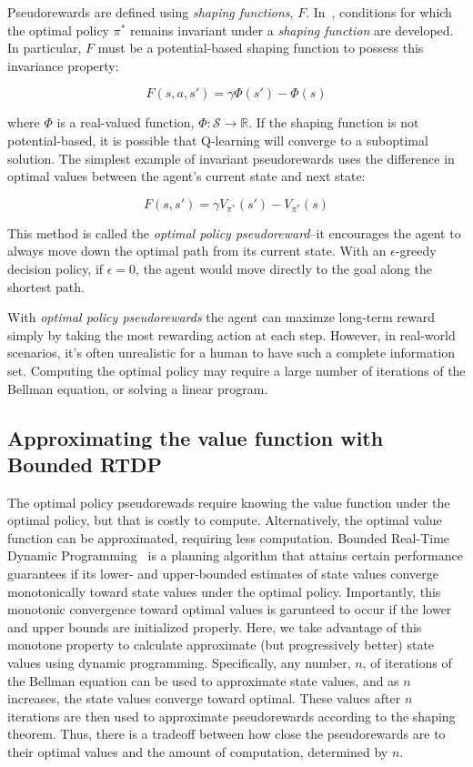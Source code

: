 \documentclass[letterpaper]{article}
\begin{document}
Pseudorewards are defined using \textit{shaping functions}, $F$.  In~\cite{ng1999policy}, conditions for which the optimal policy $\pi^*$ remains invariant under a \textit{shaping function} are developed. In particular, $F$ must be a potential-based shaping function to possess this invariance property:

\begin{equation}
F(s, a,s') = \gamma \Phi(s') - \Phi(s) 
\end{equation}

\noindent
where $\Phi$ is a real-valued function, $\Phi : \mathcal{S} \rightarrow \mathbb{R}$. If the shaping function is not potential-based, it is possible that Q-learning will converge to a suboptimal solution. The simplest example of invariant pseudorewards uses the difference in optimal values between the agent's current state and next state:

\begin{equation}
F(s, s') = \gamma V_{\pi^*}(s') - V_{\pi^*}(s) 
\end{equation}

This method is called the \textit{optimal policy pseudoreward}--it encourages the agent to always move down the optimal path from its current state. With an $\epsilon$-greedy decision policy, if $\epsilon = 0$, the agent would move directly to the goal along the shortest path.

With \textit{optimal policy pseudorewards} the agent can maximze long-term reward simply by taking the most rewarding action at each step. However, in real-world scenarios, it's often unrealistic for a human to have such a complete information set. Computing the optimal policy may require a large number of iterations of the Bellman equation, or solving a linear program.

\subsection{Approximating the value function with Bounded RTDP}

The optimal policy pseudorewads require knowing the value function under the optimal policy, but that is costly to compute. Alternatively, the optimal value function can be approximated, requiring less computation. Bounded Real-Time Dynamic Programming~\cite{mcmahan2005bounded} is a planning algorithm that attains certain performance guarantees if its lower- and upper-bounded estimates of state values converge monotonically toward state values under the optimal policy. Importantly, this monotonic convergence toward optimal values is garunteed to occur if the lower and upper bounds are initialized properly. Here, we take advantage of this monotone property to calculate approximate (but progressively better) state values using dynamic programming.  Specifically, any number, $n$, of iterations of the Bellman equation can be used to approximate state values, and as $n$ increases, the state values converge toward optimal. These values after $n$ iterations are then used to approximate pseudorewards according to the shaping theorem. Thus, there is a tradeoff between how close the pseudorewards are to their optimal values and the amount of computation, determined by $n$.
\end{document}
